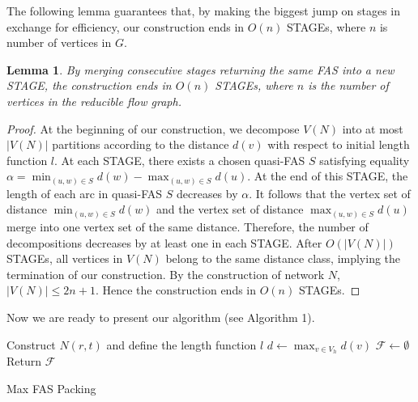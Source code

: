 \documentclass[11pt]{article}
\newtheorem{lemma}[theorem]{Lemma}
\begin{document}
The following lemma guarantees that, by making the biggest jump on stages in exchange for efficiency, our construction ends in $O(n)$ STAGEs, where $n$ is number of vertices in $G$.

\begin{lemma}
\label{lem:5}
By merging consecutive stages returning the same FAS into a new STAGE, the construction ends in $O(n)$ STAGEs, where $n$ is the number of vertices in the reducible flow graph.
\end{lemma}
\begin{proof}
At the beginning of our construction, we decompose $V(N)$ into at most $\lvert V(N)\rvert$ partitions according to the distance $d(v)$ with respect to initial length function $l$. At each STAGE, there exists a chosen quasi-FAS $S$ satisfying equality $\alpha=\min_{(u,w)\in S} d(w)-\max_{(u,w)\in S} d(u)$. At the end of this STAGE, the length of each arc in quasi-FAS $S$ decreases by $\alpha$. It follows that the vertex set of distance $\min_{(u,w)\in S} d(w)$ and the vertex set of distance $\max_{(u,w)\in S} d(u)$ merge into one vertex set of the same distance. Therefore, the number of decompositions decreases by at least one in each STAGE. After $O(\lvert V(N)\rvert)$ STAGEs, all vertices in $V(N)$ belong to the same distance class, implying the termination of our construction. By the construction of network $N$, $\lvert V(N)\rvert\leq 2n+1$. Hence the construction ends in $O(n)$ STAGEs.
\end{proof}
Now we are ready to present our algorithm (see Algorithm 1). 
\SetAlFnt{\small}
\begin{algorithm}[!ht]
  \SetAlgoLined
  \SetAlgoNoEnd
  \BlankLine
  Construct $N(r,t)$ and define the length function $l$\; %
  $d\leftarrow \max_{v\in V_h}d(v)$\;
  $\mathcal{F}\leftarrow \emptyset$\;
  Return $\mathcal{F}$\;
  \BlankLine
  \caption{Max FAS Packing}
\end{algorithm} 
\end{document}
